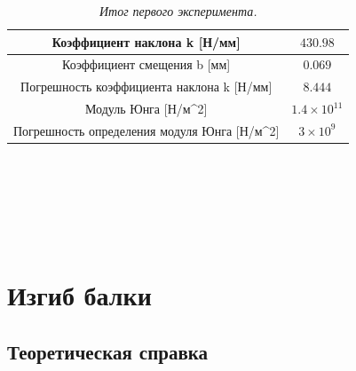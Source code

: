 \documentclass[a4paper,12pt]{report}
\begin{document}
\begin{table}[h!]
\begin{center}
\begin{tabular}{|c|l|c|l|l|}
\hline
\multicolumn{2}{|c|}{Коэффициент   наклона k {[}Н/мм{]}}                                 & \multicolumn{3}{c|}{$430.98$}          \\ \hline
\multicolumn{2}{|c|}{Коэффициент смещения   b {[}мм{]}}                                  & \multicolumn{3}{c|}{$0.069$}           \\ \hline
\multicolumn{2}{|c|}{Погрешность   коэффициента наклона k {[}Н/мм{]}}                    & \multicolumn{3}{c|}{$8.444$}           \\ \hline
\multicolumn{2}{|c|}{Модуль   Юнга {[}Н/м\textasciicircum{}2{]}}                         & \multicolumn{3}{c|}{$1.4\times 10^{11}$} \\ \hline
\multicolumn{2}{|c|}{Погрешность   определения модуля Юнга {[}Н/м\textasciicircum{}2{]}} & \multicolumn{3}{c|}{$3\times 10^{9}$}   \\ \hline
\end{tabular}
\end{center}
\caption{\textit{Итог первого эксперимента.}}
\end{table}

\textbf{ }
\\
\\
\\
\\
\\

\section*{\Large Изгиб балки}



\subsection*{Теоретическая справка}
\end{document}
